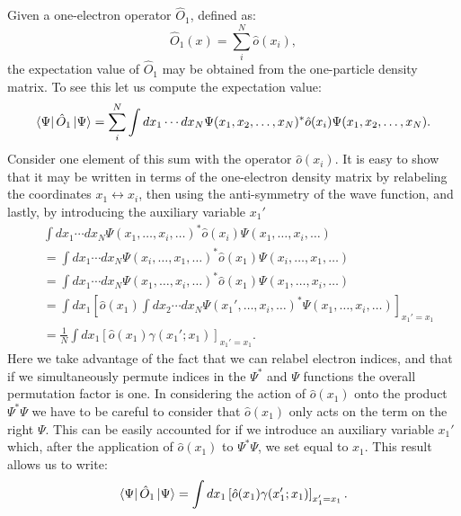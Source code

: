 \documentclass[../Main/chem532-notes.tex]{subfiles}
\begin{document}
Given a one-electron operator $\hat{O}_1$, defined as:
\begin{equation}
\hat{O}_1(x) = \sum_i^N \hat{o}(x_i),
\end{equation}
the expectation value of $\hat{O}_1$ may be obtained from the one-particle density matrix.
To see this let us compute the expectation value:
\begin{equation}
\bra{\Psi}\hat{O}_1 \ket{\Psi}
= \sum_i^N  \int dx_1 \cdots dx_N \Psi(x_1,x_2,\ldots,x_N)^* \hat{o}(x_i) \Psi(x_1,x_2,\ldots,x_N).
\end{equation}
Consider one element of this sum with the operator $\hat{o}(x_i)$.
It is easy to show that it may be written in terms of the one-electron density matrix by relabeling the  coordinates $x_1 \leftrightarrow x_i$, then using the anti-symmetry of the wave function, and lastly, by introducing the auxiliary variable $x_1'$
\begin{equation}
\begin{split}
&\int dx_1 \cdots dx_N \Psi(x_1,\ldots,x_i,\ldots)^* \hat{o}(x_i) \Psi(x_1,\ldots,x_i,\ldots) \\
&= \int dx_1 \cdots dx_N \Psi(x_i,\ldots,x_1,\ldots)^* \hat{o}(x_1) \Psi(x_i,\ldots,x_1,\ldots)\\
&= \int dx_1 \cdots dx_N \Psi(x_1,\ldots,x_i,\ldots)^* \hat{o}(x_1) \Psi(x_1,\ldots,x_i,\ldots)\\
&= \int dx_1 \left[ \hat{o}(x_1) \int dx_2 \cdots dx_N \Psi(x_1',\ldots,x_i,\ldots)^* \Psi(x_1,\ldots,x_i,\ldots) \right]_{x_1' = x_1}\\
&= \frac{1}{N} \int dx_1 \left[ \hat{o}(x_1) \gamma(x_1';x_1) \right]_{x_1' = x_1}.
\end{split}
\end{equation}
Here we take advantage of the fact that we can relabel electron indices, and that if we simultaneously permute indices in the $\Psi^*$ and $\Psi$ functions the overall permutation factor is one. In considering the action of $\hat{o}(x_1)$ onto the product $\Psi^* \Psi$ we have to be careful to consider that $\hat{o}(x_1)$ only acts on the term on the right $\Psi$. This can be easily accounted for if we introduce an auxiliary variable $x_1'$ which, after the application of $\hat{o}(x_1)$ to $\Psi^* \Psi$, we set equal to $x_1$.
This result allows us to write:
\begin{equation}
\bra{\Psi}\hat{O}_1 \ket{\Psi}
= \int dx_1 \left[ \hat{o}(x_1) \gamma(x_1';x_1) \right]_{x_1' = x_1}.
\end{equation}
\end{document}
